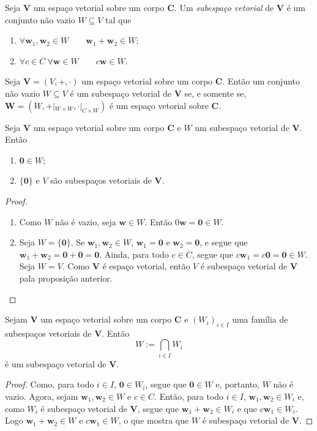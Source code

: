 \begin{defi}
	Seja $\bm V$ um espaço vetorial sobre um corpo $\bm C$. Um \emph{subespaço vetorial} de $\bm V$ é um conjunto não vazio $W \subseteq V$ tal que
	\begin{enumerate}
	\item $\forall \bm w_1,\bm w_2 \in W \qquad \bm w_1 + \bm w_2 \in W$;
	\item $\forall c \in C \ \forall \bm w \in W \qquad c \bm w \in W$.
	\end{enumerate}
\end{defi}

\begin{prop}
	Seja $\bm V=(V,+,\cdot)$ um espaço vetorial sobre um corpo $\bm C$. Então um conjunto não vazio $W \subseteq V$ é um subespaço vetorial de $\bm V$ se, e somente se, $\bm W=(W,+|_{W \times W},\cdot|_{C \times W})$ é um espaço vetorial sobre $\bm C$.
\end{prop}

\begin{prop}
	Seja $\bm V$ um espaço vetorial sobre um corpo $\bm C$ e $W$ um subespaço vetorial de $\bm V$. Então
	\begin{enumerate}
	\item $\bm 0 \in W$;
	\item $\{\bm 0\}$ e $V$ são subespaços vetoriais de $\bm V$.
	\end{enumerate}
\end{prop}
\begin{proof}
	\begin{enumerate}
	\item Como $W$ não é vazio, seja $\bm w \in W$. Então $0 \bm w = \bm 0 \in W$.
	\item Seja $W=\{\bm 0\}$. Se $\bm w_1,\bm w_2 \in W$, $\bm w_1 = \bm 0$ e $\bm w_2 =\bm 0$, e segue que $\bm w_1 + \bm w_2 = \bm 0 + \bm 0 = \bm 0$. Ainda, para todo $c \in C$, segue que $c\bm w_1 = c\bm 0=\bm 0 \in W$.
	Seja $W=V$. Como $\bm V$ é espaço vetorial, então $V$ é subespaço vetorial de $\bm V$ pala proposição anterior. \qedhere
	\end{enumerate}
\end{proof}

\begin{prop}
	Sejam $\bm V$ um espaço vetorial sobre um corpo $\bm C$ e $(W_i)_{i \in I}$ uma família de subespaços vetoriais de $\bm V$. Então
	\begin{equation*}
	W := \bigcap_{i \in I} W_i
	\end{equation*}
é um subespaço vetorial de $\bm V$.
\end{prop}
\begin{proof}
	Como, para todo $i \in I$, $\bm 0 \in W_i$, segue que $\bm 0 \in W$ e, portanto, $W$ não é vazio. Agora, sejam $\bm w_1,\bm w_2 \in W$ e $c \in C$. Então, para todo $i \in I$, $\bm w_1,\bm w_2 \in W_i$ e, como $W_i$ é subespaço vetorial de $\bm V$, segue que $\bm w_1+\bm w_2 \in W_i$ e que $c\bm w_1 \in W_i$. Logo $\bm w_1+\bm w_2 \in W$ e $c\bm w_1 \in W$, o que mostra que $W$ é subespaço vetorial de $\bm V$.
\end{proof}

